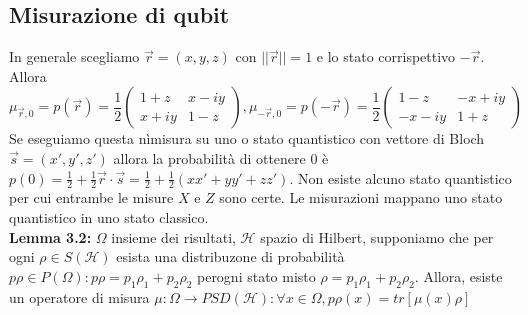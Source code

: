 \documentclass{report}
\begin{document}
\subsection{Misurazione di qubit}
In generale scegliamo $\vec{r}=(x,y,z)$ con $||\vec{r}||=1$ e lo stato corrispettivo $-\vec{r}$. Allora 
$$\mu_{\vec{r},0}=p(\vec{r})=\frac{1}{2}
\begin{pmatrix}
    1+z & x-iy\\
    x+iy & 1-z
\end{pmatrix}, 
\mu_{-\vec{r},0}=p(-\vec{r})=\frac{1}{2}
\begin{pmatrix}
    1-z & -x+iy\\
    -x-iy & 1+z
\end{pmatrix}
$$
Se eseguiamo questa nìmisura su uno o stato quantistico con vettore di Bloch $\vec{s}=(x',y',z')$ allora la probabilità di ottenere $0$ è $p(0)= \frac{1}{2}+\frac{1}{2}\vec{r}\cdot\vec{s}=\frac{1}{2}+\frac{1}{2}(xx'+yy'+zz')$. Non esiste alcuno stato quantistico per cui entrambe le misure $X$ e $Z$ sono certe. Le misurazioni mappano uno stato quantistico in uno stato classico.
\medskip
\\ \textbf{Lemma 3.2:} $\Omega$ insieme dei risultati, $\mathcal{H}$ spazio di Hilbert, supponiamo che per ogni $\rho\in S(\mathcal{H})$ esista una distribuzone di probabilità $p\rho\in P(\Omega): p\rho =p_1\rho_1+p_2\rho_2$ perogni stato misto
$\rho = p_1\rho_1+p_2\rho_2$. Allora, esiste un operatore di misura $\mu:\Omega\rightarrow\textit{PSD}(\mathcal{H}):\forall x\in\Omega, p\rho(x)=\textit{tr}[\mu(x)\rho]$
\end{document}
